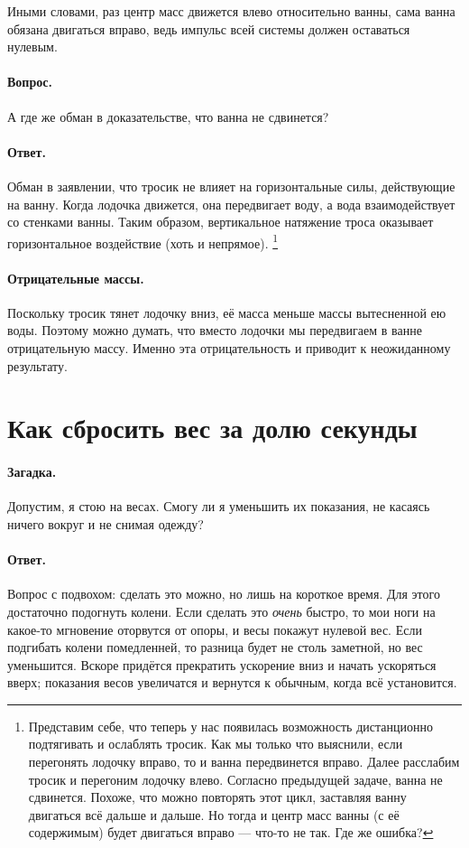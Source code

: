 Иными словами, раз центр масс движется влево относительно ванны, сама ванна обязана двигаться вправо, ведь импульс всей системы должен оставаться нулевым.

\paragraph{Вопрос.}
А где же обман в доказательстве, что ванна не сдвинется?

\paragraph{Ответ.}
Обман в заявлении, что тросик не влияет на горизонтальные силы, действующие на ванну.
Когда лодочка движется, она передвигает воду, а вода взаимодействует со стенками ванны.
Таким образом, вертикальное натяжение троса оказывает горизонтальное воздействие (хоть и непрямое).%
\footnote{Представим себе, что теперь у нас появилась возможность дистанционно подтягивать и ослаблять тросик.
Как мы только что выяснили, если перегонять лодочку вправо, то и ванна передвинется вправо.
Далее расслабим тросик и перегоним лодочку влево.
Согласно предыдущей задаче, ванна не сдвинется.
Похоже, что можно повторять этот цикл, заставляя ванну двигаться всё дальше и дальше.
Но тогда и центр масс ванны (с её содержимым) будет двигаться вправо --- что-то не так.
Где же ошибка? \pr}

\paragraph{Отрицательные массы.}
Поскольку тросик тянет лодочку вниз, её масса меньше массы вытесненной ею воды.
Поэтому можно думать, что вместо лодочки мы передвигаем в ванне отрицательную массу.
Именно эта отрицательность и приводит к неожиданному результату.

\section{Как сбросить вес за долю секунды}

\paragraph{Загадка.}
Допустим, я стою на весах.
Смогу ли я уменьшить их показания, не касаясь ничего вокруг и не снимая одежду?

\paragraph{Ответ.}
Вопрос с подвохом: сделать это можно, но лишь на короткое время.
Для этого достаточно подогнуть колени.
Если сделать это \emph{очень} быстро, то мои ноги на какое-то мгновение оторвутся от опоры, и весы покажут нулевой вес.
Если подгибать колени помедленней, то разница будет не столь заметной, но вес уменьшится.
Вскоре придётся прекратить ускорение вниз и начать ускоряться вверх; показания весов увеличатся и вернутся к обычным, когда всё установится.

